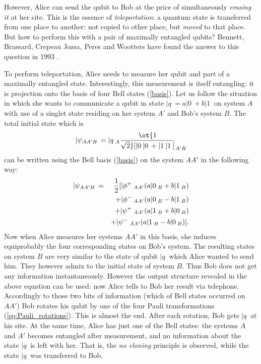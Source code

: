 \documentclass[rmp,12pt,preprint]{revtex4-2}
\begin{document}
However, Alice can send the qubit to Bob at the price of
simultaneously {\it erasing it} at her site. This is the essence of
{\it teleportation}: a quantum state is transferred from one place to
another: not copied to other place, but {\it moved} to that place. But
how to perform this with a pair of maximally entangled qubits?
Bennett, Brassard, Crepeau Jozsa, Peres and Wootters have found the
answer to this question in 1993 \cite{Teleportation}.

To perform teleportation, Alice needs to measure her qubit and part of
a maximally entangled state. Interestingly, this measurement is itself
entangling: it is projection onto the basis of four Bell states
(\ref{basis}). Let us follow the situation in which she wants to
communicate a qubit in state $|q\>=a|0\>+b|1\>$ on system $A$ with use
of a singlet state residing on her system $A'$ and Bob's system
$B$. The total initial state which is
\begin{equation}
|\psi_{AA'B}\> =
|q\>_A\ot{1\over \sqrt{2}}[|0\>|0\> + |1\>|1\>]_{A'B}
\end{equation}
can be written using the Bell basis (\ref {basis}) on the system $AA'$
in the following way:
\begin{eqnarray}
  |\psi_{AA'B}\> &=& {1\over 2}[|\phi^+\>_{AA'}(a|0\>_{B} + b|1\>_{B})\nonumber\\
  &&+|\phi^-\>_{AA'}(a|0\>_{B} - b|1\>_{B}) \nonumber \\
  &&+|\psi^+\>_{AA'}(a|1\>_{B} + b|0\>_{B})\nonumber \\
  &&+ |\psi^-\>_{AA'}(a|1\>_{B} - b|0\>_{B})].
\end{eqnarray}
Now when Alice measures her systems $AA'$ in this basis, she induces
equiprobably the four corresponding states on Bob's system. The
resulting states on system $B$ are very similar to the state of qubit
$|q\>$ which Alice wanted to send him. They however admix to the
initial state of system $B$. Thus Bob does not get any information
instantaneously. However the output structure revealed in the above
equation can be used: now Alice tells to Bob her result via
telephone. Accordingly to those two bits of information (which of Bell
states occurred on $AA'$) Bob rotates his qubit by one of the four
Pauli transformations (\ref{eq:Pauli_rotations}).  This is almost the
end. After each rotation, Bob gets $|q\>$ at his site. At the same
time, Alice has just one of the Bell states: the systems $A$ and $A'$
becomes entangled after measurement, and no information about the
state $|q\>$ is left with her. That is, the {\it no cloning} principle
is observed, while the state $|q\>$ was transferred to Bob.
\end{document}
